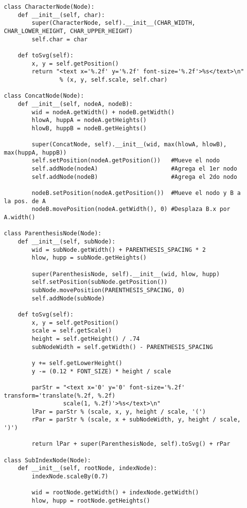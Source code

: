 \begin{verbatim}
class CharacterNode(Node):
    def __init__(self, char):
        super(CharacterNode, self).__init__(CHAR_WIDTH, CHAR_LOWER_HEIGHT, CHAR_UPPER_HEIGHT)
        self.char = char

    def toSvg(self):
        x, y = self.getPosition()
        return "<text x='%.2f' y='%.2f' font-size='%.2f'>%s</text>\n" 
        		% (x, y, self.scale, self.char)

class ConcatNode(Node):
    def __init__(self, nodeA, nodeB):
        wid = nodeA.getWidth() + nodeB.getWidth()
        hlowA, huppA = nodeA.getHeights()
        hlowB, huppB = nodeB.getHeights()

        super(ConcatNode, self).__init__(wid, max(hlowA, hlowB), max(huppA, huppB))
        self.setPosition(nodeA.getPosition())   #Mueve el nodo
        self.addNode(nodeA)                     #Agrega el 1er nodo
        self.addNode(nodeB)                     #Agrega el 2do nodo

        nodeB.setPosition(nodeA.getPosition())  #Mueve el nodo y B a la pos. de A
        nodeB.movePosition(nodeA.getWidth(), 0) #Desplaza B.x por A.width()

class ParenthesisNode(Node):
    def __init__(self, subNode):
        wid = subNode.getWidth() + PARENTHESIS_SPACING * 2
        hlow, hupp = subNode.getHeights()

        super(ParenthesisNode, self).__init__(wid, hlow, hupp)
        self.setPosition(subNode.getPosition())
        subNode.movePosition(PARENTHESIS_SPACING, 0)
        self.addNode(subNode)

    def toSvg(self):
        x, y = self.getPosition()
        scale = self.getScale()
        height = self.getHeight() / .74
        subNodeWidth = self.getWidth() - PARENTHESIS_SPACING

        y += self.getLowerHeight()
        y -= (0.12 * FONT_SIZE) * height / scale

        parStr = "<text x='0' y='0' font-size='%.2f' transform='translate(%.2f, %.2f) 
        		 scale(1, %.2f)'>%s</text>\n"
        lPar = parStr % (scale, x, y, height / scale, '(')
        rPar = parStr % (scale, x + subNodeWidth, y, height / scale, ')')

        return lPar + super(ParenthesisNode, self).toSvg() + rPar

class SubIndexNode(Node):
    def __init__(self, rootNode, indexNode):
        indexNode.scaleBy(0.7)

        wid = rootNode.getWidth() + indexNode.getWidth()
        hlow, hupp = rootNode.getHeights()


\end{verbatim}
